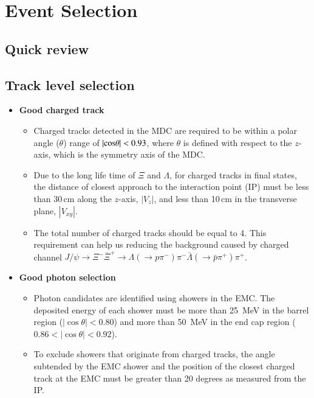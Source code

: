 \section{Event Selection}
\label{sec:eventselection}
\subsection{Quick review}

\subsection{Track level selection}
\begin{itemize}
\item {\bf Good charged track}
\begin{itemize}
\item Charged tracks detected in the MDC are required to be within a polar angle ($\theta$) range of $|\rm{cos\theta}|<0.93$, where $\theta$ is defined with respect to the $z$-axis,
which is the symmetry axis of the MDC.

\item Due to the long life time of $\Xi$ and $\Lambda$, for charged tracks in final states,
	the distance of closest approach to the interaction point (IP)
must be less than 30\,cm
along the $z$-axis, $|V_{z}|$,
and less than 10\,cm
in the transverse plane, $|V_{xy}|$.
\item The total number of charged tracks should be equal to 4. This requirement can help us 
	reducing the background caused by charged channel
		$J/\psi\to \Xi^- \bar{\Xi}^+ \to \Lambda(\to p\pi^-)\pi^- \bar{\Lambda}(\to \bar{p} \pi^+) \pi^+$.
\end{itemize}
\item {\bf Good photon selection}
\begin{itemize}
  \item Photon candidates are identified using showers in the EMC.  The deposited energy of each shower must be more than 25~MeV in the barrel region ($|\cos \theta|< 0.80$) and more than 50~MeV in the end cap region ($0.86 <|\cos \theta|< 0.92$).  

\item  
To exclude showers that originate from
charged tracks,
the angle subtended by the EMC shower and the position of the closest charged track at the EMC
must be greater than 20 degrees as measured from the IP. 


\end{itemize}
\end{itemize}
